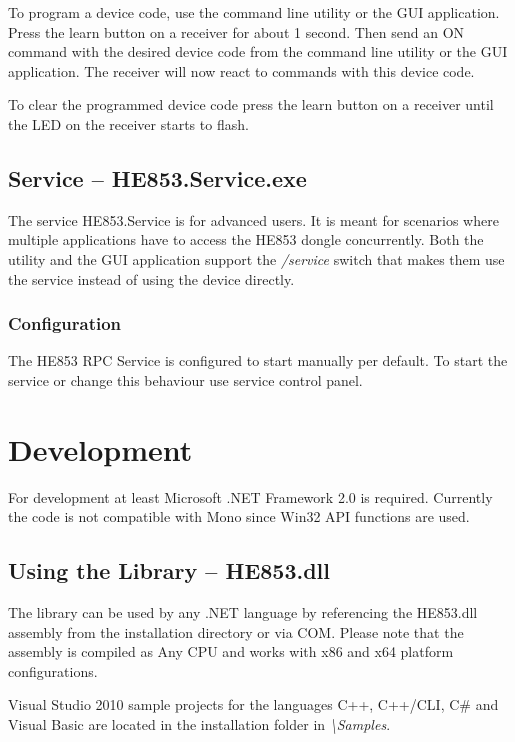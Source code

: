 \documentclass[
a4paper,
oneside,
halfparskip*,
normalheadings,
]
{scrbook}
\begin{document}
To program a device code, use the command line utility or the GUI application. Press the
learn button on a receiver for about 1 second. Then send an ON command with the desired
device code from the command line utility or the GUI application. The receiver will now
react to commands with this device code.

To clear the programmed device code press the learn button on a receiver until the LED
on the receiver starts to flash.

\section{Service -- HE853.Service.exe}

The service HE853.Service is for advanced users. It is meant for scenarios where multiple
applications have to access the HE853 dongle concurrently. Both the utility and the
GUI application support the \textit{/service} switch that makes them use the service
instead of using the device directly.

\subsection{Configuration}

The HE853 RPC Service is configured to start manually per default. To start the service
or change this behaviour use service control panel. 




\chapter{Development}

For development at least Microsoft .NET Framework 2.0 is required. Currently the code
is not compatible with Mono since Win32 API functions are used.

\section{Using the Library -- HE853.dll}

The library can be used by any .NET language by referencing the HE853.dll assembly from the
installation directory or via COM. Please note that the assembly is compiled as Any CPU
and works with x86 and x64 platform configurations.

Visual Studio 2010 sample projects for the languages C++, C++/CLI, C\# and Visual Basic
are located in the installation folder in \textit{\textbackslash Samples}.
\end{document}
